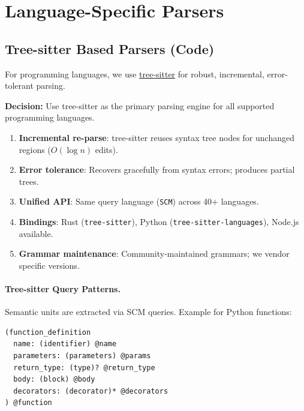 \section{Language-Specific Parsers}
\label{sec:parsing:language-parsers}

\subsection{Tree-sitter Based Parsers (Code)}
\label{sec:parsing:tree-sitter}

For programming languages, we use \href{https://tree-sitter.github.io/}{tree-sitter} for robust, incremental, error-tolerant parsing.

\begin{designdecision}
\label{dec:tree-sitter}
\textbf{Decision:} Use tree-sitter as the primary parsing engine for all supported programming languages.
\end{designdecision}

\begin{designrationale}
\begin{enumerate}
  \item \textbf{Incremental re-parse}: tree-sitter reuses syntax tree nodes for unchanged regions ($O(\log n)$ edits).
  \item \textbf{Error tolerance}: Recovers gracefully from syntax errors; produces partial trees.
  \item \textbf{Unified API}: Same query language (\texttt{SCM}) across 40+ languages.
  \item \textbf{Bindings}: Rust (\texttt{tree-sitter}), Python (\texttt{tree-sitter-languages}), Node.js available.
  \item \textbf{Grammar maintenance}: Community-maintained grammars; we vendor specific versions.
\end{enumerate}
\end{designrationale}

\paragraph{Tree-sitter Query Patterns.}
Semantic units are extracted via SCM queries. Example for Python functions:

\begin{verbatim}
(function_definition
  name: (identifier) @name
  parameters: (parameters) @params
  return_type: (type)? @return_type
  body: (block) @body
  decorators: (decorator)* @decorators
) @function
\end{verbatim}


